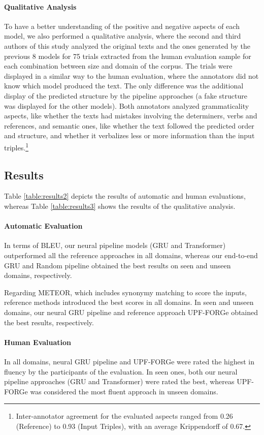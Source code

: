 \documentclass[11pt,a4paper]{article}
\begin{document}
\paragraph{Qualitative Analysis} To have a better understanding of the positive and negative aspects of each model, we also performed a qualitative analysis, where the second and third authors of this study analyzed the original texts and the ones generated by the previous 8 models for 75 trials extracted from the human evaluation sample for each combination between size and domain of the corpus. The trials were displayed in a similar way to the human evaluation, where the annotators did not know which model produced the text. The only difference was the additional display of the predicted structure by the pipeline approaches (a fake structure was displayed for the other models). Both annotators analyzed grammaticality aspects, like whether the texts had mistakes involving the determiners, verbs and references, and semantic ones, like whether the text followed the predicted order and structure, and whether it verbalizes less or more information than the input triples.\footnote{Inter-annotator agreement for the evaluated aspects ranged from 0.26 (Reference) to 0.93 (Input Triples), with an average Krippendorff  of 0.67.}

\subsection{Results}

Table \ref{table:results2} depicts the results of automatic and human evaluations, whereas Table \ref{table:results3} shows the results of the qualitative analysis.

\paragraph{Automatic Evaluation} In terms of BLEU, our neural pipeline models (GRU and Transformer) outperformed all the reference approaches in all domains, whereas our end-to-end GRU and Random pipeline obtained the best results on seen and unseen domains, respectively.

Regarding METEOR, which includes synonymy matching to score the inputs, reference methods introduced the best scores in all domains. In seen and unseen domains, our neural GRU pipeline and reference approach UPF-FORGe obtained the best results, respectively.

\paragraph{Human Evaluation} In all domains, neural GRU pipeline and UPF-FORGe were rated the highest in fluency by the participants of the evaluation. In seen ones, both our neural pipeline approaches (GRU and Transformer) were rated the best, whereas UPF-FORGe was considered the most fluent approach in unseen domains.
\end{document}
